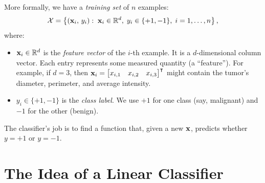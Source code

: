 \documentclass[11pt, letterpaper]{article}
\newcommand{\R}{\mathbb{R}}
\newcommand{\setX}{\mathcal{X}}
\begin{document}
More formally, we have a \emph{training set} of $n$ examples:
\begin{equation}
    \setX = \left\{ \left(\vb{x}_i,\, y_i\right) :\; \vb{x}_i \in \R^d,\; y_i \in \{+1, -1\},\; i = 1, \ldots, n \right\},
\end{equation}
where:
\begin{itemize}[leftmargin=2em]
    \item $\vb{x}_i \in \R^d$ is the \emph{feature vector} of the $i$-th example. It is a $d$-dimensional column vector. Each entry represents some measured quantity (a ``feature''). For example, if $d = 3$, then $\vb{x}_i = \begin{bmatrix} x_{i,1} & x_{i,2} & x_{i,3} \end{bmatrix}^{\intercal}$ might contain the tumor's diameter, perimeter, and average intensity.
    \item $y_i \in \{+1, -1\}$ is the \emph{class label}. We use $+1$ for one class (say, malignant) and $-1$ for the other (benign).
\end{itemize}
The classifier's job is to find a function that, given a new $\vb{x}$, predicts whether $y = +1$ or $y = -1$.

\section{The Idea of a Linear Classifier}
\end{document}
